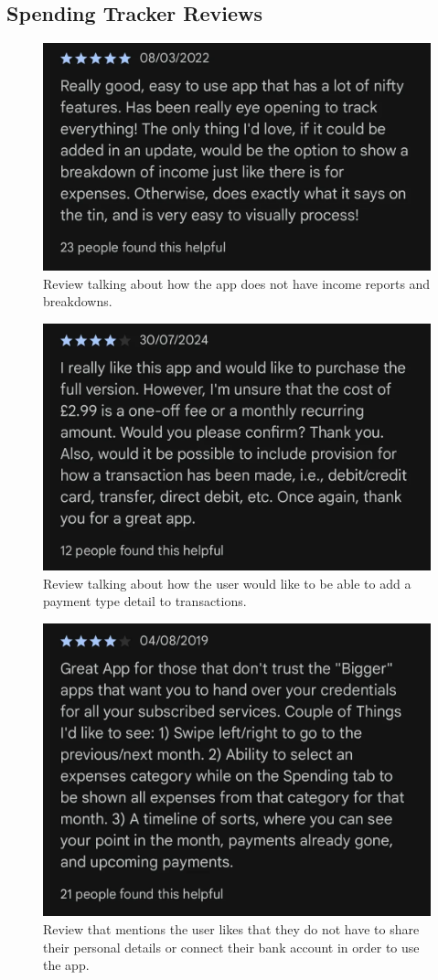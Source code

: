 \documentclass{l4proj}
\begin{document}
\begin{appendices}
\section{Spending Tracker Reviews}
\begin{figure}[H]
    \centering
    \includegraphics[width=0.5\linewidth]{images/App-Comparison/spending-tracker-review-1.png}
    \caption{Review talking about how the app does not have income reports and breakdowns.}
    \label{fig:enter-label}
\end{figure}
\begin{figure}[H]
    \centering
    \includegraphics[width=0.5\linewidth]{images/App-Comparison/spending-tracker-review-2.png}
    \caption{Review talking about how the user would like to be able to add a payment type detail to transactions.}
    \label{fig:enter-label}
\end{figure}
\begin{figure}[H]
    \centering
    \includegraphics[width=0.5\linewidth]{images/App-Comparison/spending-tracker-review-3.png}
    \caption{Review that mentions the user likes that they do not have to share their personal details or connect their bank account in order to use the app.}
    \label{fig:enter-label}
\end{figure}


\end{appendices}
\end{document}
